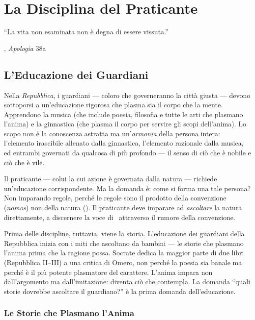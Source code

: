\chapter{La Disciplina del Praticante}

\epigraph{``La vita non esaminata non \`e degna di essere vissuta.''}{\textcite{plato1997complete}, \emph{Apologia} 38a}

\section{L'Educazione dei Guardiani}

Nella \emph{Repubblica}, i guardiani --- coloro che governeranno la citt\`a
giusta --- devono sottoporsi a un'educazione rigorosa che plasma sia il
corpo che la mente. Apprendono la musica (che include poesia, filosofia e
tutte le arti che plasmano l'anima) e la ginnastica (che plasma il corpo
per servire gli scopi dell'anima). Lo scopo non \`e la conoscenza astratta
ma un'\emph{armonia} della persona intera: l'elemento irascibile allenato
dalla ginnastica, l'elemento razionale dalla musica, ed entrambi governati
da qualcosa di pi\`u profondo --- il senso di ci\`o che \`e nobile e
ci\`o che \`e vile.

Il praticante --- colui la cui azione \`e governata dalla natura ---
richiede un'educazione corrispondente. Ma la domanda \`e: come si forma
una tale persona? Non imparando regole, perch\'e le regole sono il prodotto
della convenzione (\emph{nomos}) non della natura (\physis). Il praticante
deve imparare ad \emph{ascoltare} la natura direttamente, a discernere la
voce di \physis\ attraverso il rumore della convenzione.

Prima delle discipline, tuttavia, viene la storia. L'educazione dei
guardiani della Repubblica inizia con i miti che ascoltano da bambini ---
le storie che plasmano l'anima prima che la ragione possa. Socrate dedica
la maggior parte di due libri (Repubblica II--III) a una critica di Omero,
non perch\'e la poesia sia banale ma perch\'e \`e il pi\`u potente
plasmatore del carattere. L'anima impara non dall'argomento ma
dall'imitazione: diventa ci\`o che contempla. La domanda ``quali storie
dovrebbe ascoltare il guardiano?'' \`e la prima domanda dell'educazione.

\subsection{Le Storie che Plasmano l'Anima}

